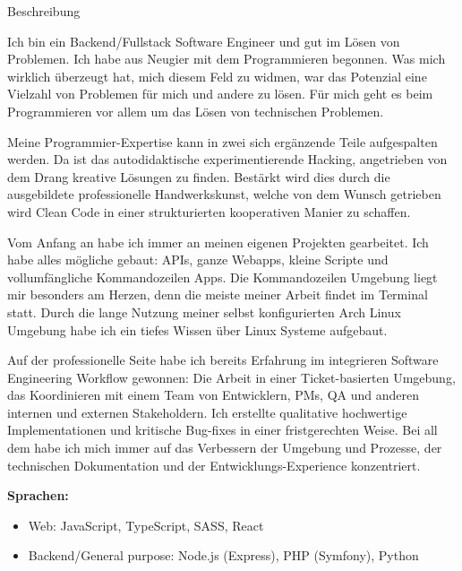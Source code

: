 \documentclass{cv}
\begin{document}
\begin{rSection}{Beschreibung}

  \newcommand\skillWidth{0.48}
  \begin{minipage}[t]{\skillWidth\linewidth}

    Ich bin ein Backend/Fullstack Software Engineer und gut im Lösen von
    Problemen.
    Ich habe aus Neugier mit dem Programmieren begonnen.
    Was mich wirklich überzeugt hat, mich diesem Feld zu widmen, war das
    Potenzial eine Vielzahl von Problemen für mich und andere zu lösen.
    Für mich geht es beim Programmieren vor allem um das Lösen von technischen Problemen.

    \medskip

    Meine Programmier-Expertise kann in zwei sich ergänzende Teile aufgespalten werden.
    Da ist das autodidaktische experimentierende Hacking, angetrieben von dem
    Drang kreative Lösungen zu finden.
    Bestärkt wird dies durch die ausgebildete professionelle Handwerkskunst,
    welche von dem Wunsch getrieben wird Clean Code in einer strukturierten
    kooperativen Manier zu schaffen.

    \medskip

    Vom Anfang an habe ich immer an meinen eigenen Projekten gearbeitet.
    Ich habe alles mögliche gebaut: APIs, ganze Webapps, kleine Scripte und vollumfängliche Kommandozeilen Apps.
    Die Kommandozeilen Umgebung liegt mir besonders am Herzen,
    denn die meiste meiner Arbeit findet im Terminal statt.
    Durch die lange Nutzung meiner selbst konfigurierten Arch Linux
    Umgebung habe ich ein tiefes Wissen über Linux Systeme aufgebaut.

  \end{minipage}
  \hfill
  \begin{minipage}[t]{\skillWidth\linewidth}

    Auf der professionelle Seite habe ich bereits Erfahrung im integrieren
    Software Engineering Workflow gewonnen: Die Arbeit in einer Ticket-basierten
    Umgebung, das Koordinieren mit einem Team von Entwicklern, PMs, QA und anderen
    internen und externen Stakeholdern.
    Ich erstellte qualitative hochwertige Implementationen und kritische Bug-fixes in
    einer fristgerechten Weise.
    Bei all dem habe ich mich immer auf das Verbessern der Umgebung und
    Prozesse, der technischen Dokumentation und der Entwicklungs-Experience
    konzentriert.

    \medskip

    \textbf{Sprachen:}
    \begin{itemize}
      \item Web: JavaScript, TypeScript, SASS, React
      \item Backend/General purpose: Node.js (Express), PHP (Symfony), Python
    \end{itemize}


\end{minipage}
\end{rSection}
\end{document}
